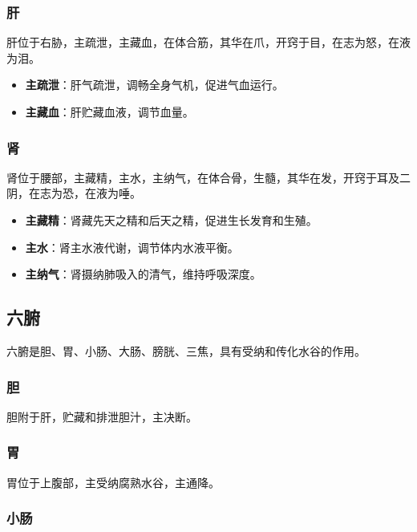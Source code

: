 \documentclass[12pt,UTF8]{ctexbook}
\begin{document}
\subsubsection{肝}

肝位于右胁，主疏泄，主藏血，在体合筋，其华在爪，开窍于目，在志为怒，在液为泪。

\begin{itemize}
\item \textbf{主疏泄}：肝气疏泄，调畅全身气机，促进气血运行。
\item \textbf{主藏血}：肝贮藏血液，调节血量。
\end{itemize}

\subsubsection{肾}

肾位于腰部，主藏精，主水，主纳气，在体合骨，生髓，其华在发，开窍于耳及二阴，在志为恐，在液为唾。

\begin{itemize}
\item \textbf{主藏精}：肾藏先天之精和后天之精，促进生长发育和生殖。
\item \textbf{主水}：肾主水液代谢，调节体内水液平衡。
\item \textbf{主纳气}：肾摄纳肺吸入的清气，维持呼吸深度。
\end{itemize}

\subsection{六腑}

六腑是胆、胃、小肠、大肠、膀胱、三焦，具有受纳和传化水谷的作用。

\subsubsection{胆}

胆附于肝，贮藏和排泄胆汁，主决断。

\subsubsection{胃}

胃位于上腹部，主受纳腐熟水谷，主通降。

\subsubsection{小肠}
\end{document}
